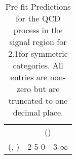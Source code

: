 \begin{table}[h!]
\tiny
\centering
\caption{Pre fit Predictions for the QCD process in the signal region for 2.1\ifb for symmetric categories. All entries are non-zero but are truncated to one decimal place.\label{tab:predsep_sig_qcd_sym}}
\begin{tabular}
{ccc}
	\hline\hline
	& \multicolumn{2}{c}{\scalht (\gev)} \\ 
	 (\njet,  \nb) & 2-5-0 & 3-$\infty$ \\ [0.8ex] 
\hline
	\hline
	\hline
\end{tabular}
\end{table}
